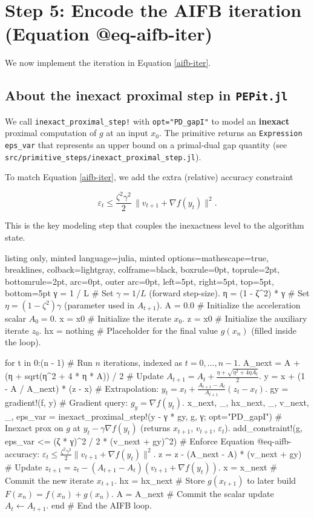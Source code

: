 \documentclass{article}
\begin{document}
\section{Step 5: Encode the AIFB iteration (Equation @eq-aifb-iter)}

We now implement the iteration in Equation \eqref{aifb-iter}.

\subsection{About the inexact proximal step in \texttt{PEPit.jl}}

We call \texttt{inexact\_proximal\_step!} with \texttt{opt="PD\_gapI"} to model an \textbf{inexact} proximal computation of $g$ at an input $x_0$.
The primitive returns an \texttt{Expression} \texttt{eps\_var} that represents an upper bound on a primal-dual gap quantity (see \texttt{src/primitive\_steps/inexact\_proximal\_step.jl}).

To match Equation \eqref{aifb-iter}, we add the extra (relative) accuracy constraint

\begin{equation}\label{aifb-accuracy}
\varepsilon_t \le \frac{\zeta^2\gamma^2}{2}\,\|v_{t+1}+\nabla f(y_t)\|^2.
\end{equation}

This is the key modeling step that couples the inexactness level to the algorithm state.

\begin{tcblisting}{listing only, minted language=julia, minted options={mathescape=true, breaklines}, colback=lightgray, colframe=black, boxrule=0pt, toprule=2pt, bottomrule=2pt, arc=0pt, outer arc=0pt, left=5pt, right=5pt, top=5pt, bottom=5pt}
γ = 1 / L # Set $\gamma = 1/L$ (forward step-size).
η = (1 - ζ^2) * γ # Set $\eta = (1-\zeta^2)\gamma$ (parameter used in $A_{t+1}$).
A = 0.0 # Initialize the acceleration scalar $A_0 = 0$.
x = x0 # Initialize the iterate $x_0$.
z = x0 # Initialize the auxiliary iterate $z_0$.
hx = nothing # Placeholder for the final value $g(x_n)$ (filled inside the loop).

for t in 0:(n - 1) # Run $n$ iterations, indexed as $t=0,\dots,n-1$.
    A_next = A + (η + sqrt(η^2 + 4 * η * A)) / 2 # Update $A_{t+1}=A_t+\frac{\eta+\sqrt{\eta^2+4\eta A_t}}{2}$.
    y = x + (1 - A / A_next) * (z - x) # Extrapolation: $y_t=x_t+\frac{A_{t+1}-A_t}{A_{t+1}}(z_t-x_t)$.
    gy = gradient!(f, y) # Gradient query: $g_y=\nabla f(y_t)$.
    x_next, _, hx_next, _, v_next, _, eps_var = inexact_proximal_step!(y - γ * gy, g, γ; opt="PD_gapI") # Inexact prox on $g$ at $y_t-\gamma\nabla f(y_t)$ (returns $x_{t+1}$, $v_{t+1}$, $\varepsilon_t$).
    add_constraint!(g, eps_var <= (ζ * γ)^2 / 2 * (v_next + gy)^2) # Enforce Equation @eq-aifb-accuracy: $\varepsilon_t \le \frac{\zeta^2\gamma^2}{2}\|v_{t+1}+\nabla f(y_t)\|^2$.
    z = z - (A_next - A) * (v_next + gy) # Update $z_{t+1}=z_t-(A_{t+1}-A_t)(v_{t+1}+\nabla f(y_t))$.
    x = x_next # Commit the new iterate $x_{t+1}$.
    hx = hx_next # Store $g(x_{t+1})$ to later build $F(x_n)=f(x_n)+g(x_n)$.
    A = A_next # Commit the scalar update $A_t \leftarrow A_{t+1}$.
end # End the AIFB loop.
\end{tcblisting}
\end{document}
